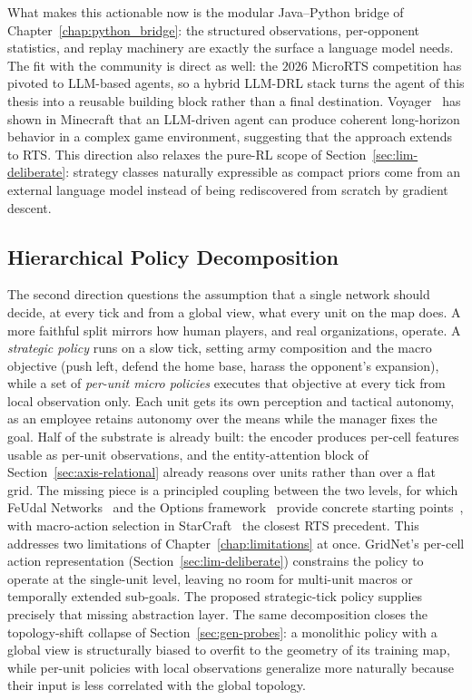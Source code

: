 What makes this actionable now is the modular Java--Python bridge of Chapter~\ref{chap:python_bridge}: the structured observations, per-opponent statistics, and replay machinery are exactly the surface a language model needs. The fit with the community is direct as well: the $2026$ MicroRTS competition has pivoted to LLM-based agents, so a hybrid LLM-DRL stack turns the agent of this thesis into a reusable building block rather than a final destination. Voyager~\cite{wangVoyagerOpenEndedEmbodied2023} has shown in Minecraft that an LLM-driven agent can produce coherent long-horizon behavior in a complex game environment, suggesting that the approach extends to RTS. This direction also relaxes the pure-RL scope of Section~\ref{sec:lim-deliberate}: strategy classes naturally expressible as compact priors come from an external language model instead of being rediscovered from scratch by gradient descent.

\subsection{Hierarchical Policy Decomposition}

The second direction questions the assumption that a single network should decide, at every tick and from a global view, what every unit on the map does. A more faithful split mirrors how human players, and real organizations, operate. A \emph{strategic policy} runs on a slow tick, setting army composition and the macro objective (push left, defend the home base, harass the opponent's expansion), while a set of \emph{per-unit micro policies} executes that objective at every tick from local observation only. Each unit gets its own perception and tactical autonomy, as an employee retains autonomy over the means while the manager fixes the goal. Half of the substrate is already built: the  encoder produces per-cell features usable as per-unit observations, and the entity-attention block of Section~\ref{sec:axis-relational} already reasons over units rather than over a flat grid. The missing piece is a principled coupling between the two levels, for which FeUdal Networks~\cite{vezhnevetsFeUdalNetworksHierarchical2017} and the Options framework~\cite{suttonMDPsSemiMDPsFramework1999} provide concrete starting points~\cite{jiangHierarchicalReinforcementLearning2025}, with macro-action selection in StarCraft~\cite{xuMacroActionSelection2018} the closest RTS precedent. This addresses two limitations of Chapter~\ref{chap:limitations} at once. GridNet's per-cell action representation (Section~\ref{sec:lim-deliberate}) constrains the policy to operate at the single-unit level, leaving no room for multi-unit macros or temporally extended sub-goals. The proposed strategic-tick policy supplies precisely that missing abstraction layer. The same decomposition closes the topology-shift collapse of Section~\ref{sec:gen-probes}: a monolithic policy with a global view is structurally biased to overfit to the geometry of its training map, while per-unit policies with local observations generalize more naturally because their input is less correlated with the global topology.

